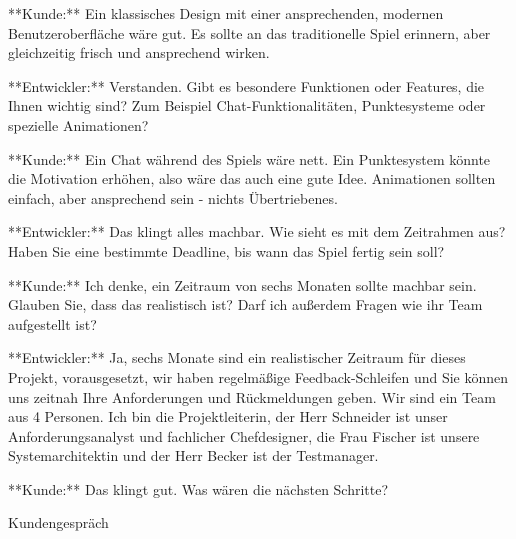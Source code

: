 \begin{prompt}[H]
\begin{tcolorbox}[colback=gray!20, colframe=gray!20, boxrule=0pt, sharp corners]
        **Kunde:** Ein klassisches Design mit einer ansprechenden, modernen Benutzeroberfläche wäre gut. Es sollte an das traditionelle Spiel erinnern, aber gleichzeitig frisch und ansprechend wirken.
        
        **Entwickler:** Verstanden. Gibt es besondere Funktionen oder Features, die Ihnen wichtig sind? Zum Beispiel Chat-Funktionalitäten, Punktesysteme oder spezielle Animationen?
        
        **Kunde:** Ein Chat während des Spiels wäre nett. Ein Punktesystem könnte die Motivation erhöhen, also wäre das auch eine gute Idee. Animationen sollten einfach, aber ansprechend sein - nichts Übertriebenes.
        
        **Entwickler:** Das klingt alles machbar. Wie sieht es mit dem Zeitrahmen aus? Haben Sie eine bestimmte Deadline, bis wann das Spiel fertig sein soll?
        
        **Kunde:** Ich denke, ein Zeitraum von sechs Monaten sollte machbar sein. Glauben Sie, dass das realistisch ist? Darf ich außerdem Fragen wie ihr Team aufgestellt ist?
        
        **Entwickler:** Ja, sechs Monate sind ein realistischer Zeitraum für dieses Projekt, vorausgesetzt, wir haben regelmäßige Feedback-Schleifen und Sie können uns zeitnah Ihre Anforderungen und Rückmeldungen geben. Wir sind ein Team aus 4 Personen. Ich bin die Projektleiterin, der Herr Schneider ist unser Anforderungsanalyst und fachlicher Chefdesigner, die Frau Fischer ist unsere Systemarchitektin und der Herr Becker ist der Testmanager.
        
        **Kunde:** Das klingt gut. Was wären die nächsten Schritte?
        \vfill
    \end{tcolorbox}
    \caption{Kundengespräch}
    \label{Kundengespräch1}
\end{prompt}


